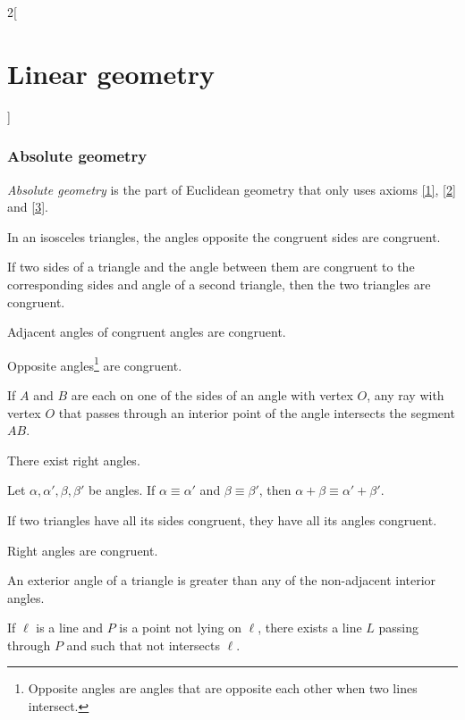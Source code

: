 \documentclass[../../../main.tex]{subfiles}
\begin{document}
\begin{multicols}{2}[\section{Linear geometry}]
\subsubsection*{Absolute geometry}
\begin{definition}
\textit{Absolute geometry} is the part of Euclidean geometry that only uses axioms \ref{1}, \ref{2} and \ref{3}.
\end{definition}
\begin{theorem}
In an isosceles triangles, the angles opposite the congruent sides are congruent.
\end{theorem}
\begin{theorem}
If two sides of a triangle and the angle between them are congruent to the corresponding sides and angle of a second triangle, then the two triangles are congruent.
\end{theorem}
\begin{theorem}
Adjacent angles of congruent angles are congruent.
\end{theorem}
\begin{theorem}
Opposite angles\footnote{Opposite angles are angles that are opposite each other when two lines intersect.} are congruent.
\end{theorem}
\begin{theorem}
If $A$ and $B$ are each on one of the sides of an angle with vertex $O$, any ray with vertex $O$ that passes through an interior point of the angle intersects the segment $AB$.
\end{theorem}
\begin{theorem}
There exist right angles.
\end{theorem}
\begin{theorem}
Let $\alpha,\alpha',\beta,\beta'$ be angles. If $\alpha\equiv\alpha'$ and $\beta\equiv\beta'$, then $\alpha+\beta\equiv\alpha'+\beta'$.
\end{theorem}
\begin{theorem}
If two triangles have all its sides congruent, they have all its angles congruent.
\end{theorem}
\begin{theorem}
Right angles are congruent.
\end{theorem}
\begin{theorem}
An exterior angle of a triangle is greater than any of the non-adjacent interior angles.
\end{theorem}
\begin{theorem}
If $\ell$ is a line and $P$ is a point not lying on $\ell$, there exists a line $L$ passing through $P$ and such that not intersects $\ell$.

\end{theorem}
\end{multicols}
\end{document}
